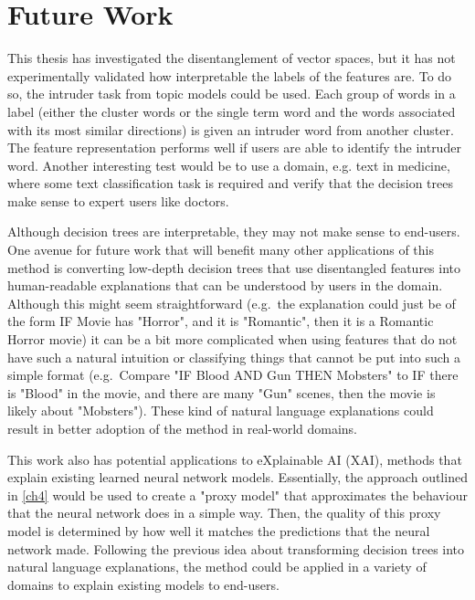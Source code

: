 \section{Future Work}


This thesis has investigated the disentanglement of  vector spaces, but it has not experimentally validated how interpretable the  labels of the features  are. To do so, the intruder task from topic models could be used. Each group of words in a label (either the cluster words or the single term word and the words associated with its most similar directions) is given an intruder word from another cluster. The feature representation performs well if users are able to identify the intruder word. Another interesting test would be to use a domain, e.g. text in medicine, where some text classification task is required and verify that the decision trees make sense to expert users like doctors. 



Although decision trees are interpretable, they may not make sense to end-users. One avenue for future work that will benefit many other applications of this method is converting low-depth decision trees that use disentangled features into human-readable explanations that can be understood by users in the domain. Although this might seem straightforward (e.g.\ the explanation could just be of the form IF Movie has "Horror", and it is "Romantic", then it is a Romantic Horror movie) it can be a bit more complicated when using features that do not have such a natural intuition or classifying things that cannot be put into such a simple format (e.g.\ Compare "IF Blood AND Gun THEN Mobsters" to IF there is "Blood" in the movie, and there are many "Gun" scenes, then the movie is likely about "Mobsters"). These kind of natural language explanations could result in better adoption of the method in real-world domains.


This work also has potential applications  to eXplainable AI (XAI), methods that explain existing learned neural network models. Essentially, the approach outlined in \ref{ch4} would be used to create a "proxy model" that approximates the  behaviour that the neural network does in a simple way. Then, the quality of this proxy model is determined by how well it matches the predictions that the neural network made. Following the previous idea about transforming decision trees into natural language explanations, the method could be applied in a variety of domains to explain existing models to end-users.

